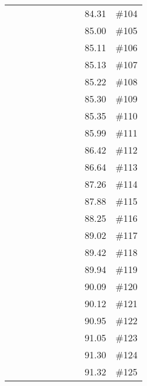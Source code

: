 \begin{longtable}{|c|c|c|c|c|c|c|c|c|c|}
 \x    & \x    & \x    &       &       & \x    &       &       & 84.31 & \#104 \\
 \x    & \x    & \x    & \x    &       & \x\m  & \x    &       & 85.00 & \#105 \\
 \x    & \x    &       & \x    & \x    &       &       &       & 85.11 & \#106 \\
 \x    & \x    & \x    & \x    &       & \x\m  &       &       & 85.13 & \#107 \\
 \x    & \x    & \x    & \x    &       & \x    & \x\m  &       & 85.22 & \#108 \\
 \x    & \x    &       & \x    & \x    &       & \x    &       & 85.30 & \#109 \\
 \x    & \x    & \x    &       &       & \x\m  & \x\m  &       & 85.35 & \#110 \\
 \x    & \x    & \x    &       &       & \x\m  &       & \x    & 85.99 & \#111 \\
 \x    & \x    &       &       &       & \x\m  &       & \x\m  & 86.42 & \#112 \\
 \x    & \x    & \x    &       &       &       &       & \x    & 86.64 & \#113 \\
 \x    & \x    & \x    & \x    &       &       & \x\m  &       & 87.26 & \#114 \\
 \x    & \x    &       &       &       &       & \x    &       & 87.88 & \#115 \\
 \x    & \x    &       & \x    & \x    & \x    & \x    &       & 88.25 & \#116 \\
 \x    & \x    & \x    &       &       &       &       &       & 89.02 & \#117 \\
 \x    & \x    &       &       &       & \x    & \x    &       & 89.42 & \#118 \\
 \x    & \x    & \x    & \x    &       & \x\m  &       & \x    & 89.94 & \#119 \\
 \x    & \x    &       &       & \x    &       & \x    &       & 90.09 & \#120 \\
 \x    & \x    & \x    &       &       & \x\m  & \x\m  &       & 90.12 & \#121 \\
 \x    & \x    &       & \x    &       &       &       &       & 90.95 & \#122 \\
 \x    & \x    &       &       &       &       &       & \x\m  & 91.05 & \#123 \\
 \x    & \x    &       & \x    &       & \x\m  &       &       & 91.30 & \#124 \\
 \x    & \x    &       & \x    & \x    & \x    &       & \x    & 91.32 & \#125 \\

\end{longtable}
